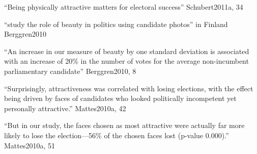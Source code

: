 ``Being physically attractive matters for electoral success'' Schubert2011a, 34


``study the role of beauty in politics using candidate photos'' in Finland Berggren2010

``An increase in our measure of beauty by one standard deviation is associated with an increase of 20\% in the number of votes for the average non-incumbent parliamentary candidate'' Berggren2010, 8


``Surprisingly, attractiveness was correlated with losing elections, with the effect being driven by faces of candidates who looked politically incompetent yet personally attractive.'' Mattes2010a, 42

``But in our study, the faces chosen as most attractive were actually far more likely to lose the election—56\% of the chosen faces lost (p-value 0.000).'' Mattes2010a, 51
